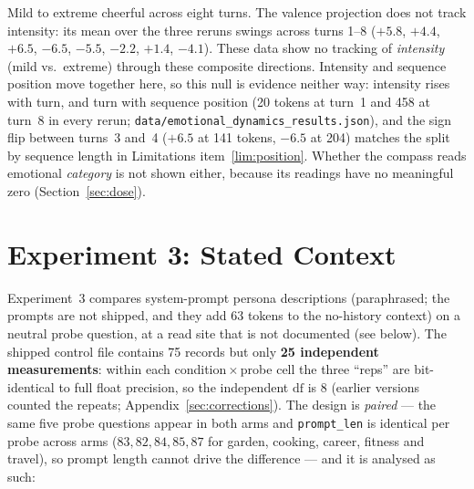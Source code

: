 \documentclass[11pt,a4paper]{article}
\begin{document}
Mild to extreme cheerful across eight turns. The valence projection
does not track intensity: its mean over the three reruns swings across
turns 1--8 ($+5.8$, $+4.4$, $+6.5$, $-6.5$, $-5.5$, $-2.2$, $+1.4$,
$-4.1$). These data show no tracking of
\emph{intensity} (mild vs.\ extreme) through these composite directions.
Intensity and sequence position move together here, so this null is
evidence neither way: intensity rises with turn, and turn with sequence
position (20 tokens at turn~1 and 458 at turn~8 in every rerun;
\texttt{data/\allowbreak emotional\_\allowbreak dynamics\_\allowbreak results.json}),
and the sign flip between turns~3 and~4 ($+6.5$ at 141 tokens, $-6.5$ at
204) matches the split by sequence length in Limitations
item~\ref{lim:position}.
Whether the compass reads emotional \emph{category} is not shown either,
because its readings have no meaningful zero (Section~\ref{sec:dose}).

\section{Experiment 3: Stated Context}
\label{sec:persona}

Experiment~3 compares system-prompt persona descriptions (paraphrased;
the prompts are not shipped, and they add 63 tokens to the no-history
context) on a neutral probe question, at a read site that is not
documented (see below). The shipped control
file contains 75 records but only \textbf{25 independent measurements}: within
each condition\,$\times$\,probe cell the three ``reps'' are bit-identical to full
float precision, so the independent $\mathrm{df}$ is 8 (earlier versions
counted the repeats; Appendix~\ref{sec:corrections}). The design is
\emph{paired} --- the same five probe questions appear in both arms and
\texttt{prompt\_len} is identical per probe across arms ($83, 82, 84, 85, 87$ for garden, cooking, career, fitness and travel),
so prompt length cannot drive the difference --- and it is analysed as such:
\end{document}
